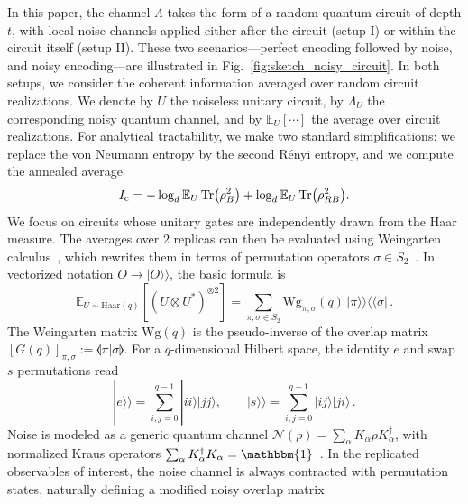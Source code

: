 \documentclass[aps,prl,twocolumn,superscriptaddress,numerical]{revtex4-2}
\newcommand{\Haar}{{\text{Haar}}} %
\newcommand{\Wg}{{\text{Wg}}} %
\newcommand{\Ic}{I_\mathrm{\rm c}} %
\newcommand{\Noise}{\mathcal{N}}
\newcommand{\idp}{e} %
\newcommand{\Id}{\mathbbm{1}}
\newcommand{\Ex}{\mathbb{E}} %
\newcommand{\nreplicas}{2}
\begin{document}
In this paper, the channel $\Lambda$ takes the form of a random quantum circuit of depth $t$, with local noise channels applied either after the circuit (setup I) or within the circuit itself (setup II). These two scenarios—perfect encoding followed by noise, and noisy encoding—are illustrated in Fig.~\ref{fig:sketch_noisy_circuit}. In both setups, we consider the coherent information averaged over random circuit realizations. We denote by $U$ the noiseless unitary circuit, by $\Lambda_U$ the corresponding noisy quantum channel, and by $\mathbb{E}_U[\cdots]$ the average over circuit realizations. For analytical tractability, we make two standard simplifications: we replace the von Neumann entropy by the second Rényi entropy, and we compute the annealed average
\begin{equation}\label{eq:annealed_average}
        \Ic=-\log_d\Ex_{U}\Tr(\rho_B^\nreplicas)+\log_d\Ex_{U}\Tr(\rho_{RB}^\nreplicas).
\end{equation}
We focus on circuits whose unitary gates are independently drawn from the Haar measure. The averages over $\nreplicas$ replicas can then be evaluated using Weingarten calculus~\cite{Collins2003MomentsUnitaryGroup,CollinsSniady2006IntegrationClassicalGroups,CollinsMatsumotoNovak2022WeingartenCalculus}, which rewrites them in terms of permutation operators $\sigma\in S_{\nreplicas}$~\cite{Nahum2017EntanglementGrowthPRX,Nahum2018OperatorSpreadingPRX,chan2021manybody,Kostenberger_2021,Collins_2022,Turkeshi2025,sierant2023entanglement}. In vectorized notation $O\to|O\rangle\!\rangle$, the basic formula is
\begin{equation}\label{eq:weingarten_formula}
\mathbb{E}_{U \sim \Haar(q)} \left[ (U \otimes U^*)^{\otimes \nreplicas} \right]
= \sum_{\pi, \sigma \in S_\nreplicas} \Wg_{\pi, \sigma}(q)\, |\pi\rangle\!\rangle \langle\!\langle \sigma| \, .
\end{equation}
The Weingarten matrix $\Wg(q)$ is the pseudo-inverse of the overlap matrix $\left[G(q)\right]_{\pi,\sigma}:=\llangle \pi |\sigma\rrangle$. For a $q$-dimensional Hilbert space, the identity $\idp$ and swap $s$ permutations read
\begin{equation}\label{eq:sigma_expanded}
   |\idp\rangle\!\rangle = \sum_{i, j = 0}^{q-1} |i i \rangle|j j\rangle, 
   \qquad
   |s\rangle\!\rangle = \sum_{i, j = 0}^{q-1} |i j \rangle|j i\rangle \, .
\end{equation}
Noise is modeled as a generic quantum channel $\Noise(\rho)=\sum_\alpha K_\alpha \rho K_\alpha^\dag$,
with normalized Kraus operators $\sum_\alpha K_\alpha^\dag K_\alpha=\Id$~\cite{Kraus1983StatesEffectsOperations,Wilde2013QuantumInformationTheory,Watrous2018TheoryQuantumInformation}. In the replicated observables of interest, the noise channel is always contracted with permutation states, naturally defining a modified noisy overlap matrix
\end{document}
